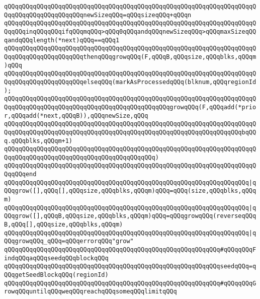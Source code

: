 \verb|qQQqqQQqqQQqqQQqqQQqqQQqqQQqqQQqqQQqqQQqqQQqqQQqqQQqqQQqqQQqqQQqqQQqqQQqqQQqqQQqqQQqqQQqqQQqnewSizeqQQq=qQQqsizeqQQq+qQQqn|\newline
\verb|qQQqqQQqqQQqqQQqqQQqqQQqqQQqqQQqqQQqqQQqqQQqqQQqqQQqqQQqqQQqqQQqqQQqqQQqqQQqinqQQqqQQqifqQQqmqQQq>qQQq0qQQqandqQQqnewSizeqQQq>qQQqmaxSizeqQQqandqQQqlength(*next)qQQq==qQQq1|\newline
\verb|qQQqqQQqqQQqqQQqqQQqqQQqqQQqqQQqqQQqqQQqqQQqqQQqqQQqqQQqqQQqqQQqqQQqqQQqqQQqqQQqqQQqqQQqqQQqthenqQQqgrowqQQq(F,qQQqB,qQQqsize,qQQqblks,qQQqm)qQQq|\newline
\verb|qQQqqQQqqQQqqQQqqQQqqQQqqQQqqQQqqQQqqQQqqQQqqQQqqQQqqQQqqQQqqQQqqQQqqQQqqQQqqQQqqQQqqQQqqQQqelseqQQq(markAsProcessedqQQq(blknum,qQQqregionId);|\newline
\verb|qQQqqQQqqQQqqQQqqQQqqQQqqQQqqQQqqQQqqQQqqQQqqQQqqQQqqQQqqQQqqQQqqQQqqQQqqQQqqQQqqQQqqQQqqQQqqQQqqQQqqQQqqQQqqQQqqQQqgrowqQQq(F,qQQqadd(*prior,qQQqadd(*next,qQQqB)),qQQqnewSize,qQQq|\newline
\verb|qQQqqQQqqQQqqQQqqQQqqQQqqQQqqQQqqQQqqQQqqQQqqQQqqQQqqQQqqQQqqQQqqQQqqQQqqQQqqQQqqQQqqQQqqQQqqQQqqQQqqQQqqQQqqQQqqQQqqQQqqQQqqQQqqQQqqQQqbqQQq.qQQqblks,qQQqm+1)|\newline
\verb|qQQqqQQqqQQqqQQqqQQqqQQqqQQqqQQqqQQqqQQqqQQqqQQqqQQqqQQqqQQqqQQqqQQqqQQqqQQqqQQqqQQqqQQqqQQqqQQqqQQqqQQqqQQqqQQq)|\newline
\verb|qQQqqQQqqQQqqQQqqQQqqQQqqQQqqQQqqQQqqQQqqQQqqQQqqQQqqQQqqQQqqQQqqQQqqQQqqQQqend|\newline
\verb|qQQqqQQqqQQqqQQqqQQqqQQqqQQqqQQqqQQqqQQqqQQqqQQqqQQqqQQqqQQqqQQqqQQq|\verb#|qQQqgrow([],qQQq[],qQQqsize,qQQqblks,qQQqm)qQQq=qQQq(size,qQQqblks,qQQqm)#\newline
\verb|qQQqqQQqqQQqqQQqqQQqqQQqqQQqqQQqqQQqqQQqqQQqqQQqqQQqqQQqqQQqqQQqqQQq|\verb#|qQQqgrow([],qQQqB,qQQqsize,qQQqblks,qQQqm)qQQq=qQQqgrowqQQq(reverseqQQqB,qQQq[],qQQqsize,qQQqblks,qQQqm)#\newline
\verb|qQQqqQQqqQQqqQQqqQQqqQQqqQQqqQQqqQQqqQQqqQQqqQQqqQQqqQQqqQQqqQQqqQQq|\verb#|qQQqgrowqQQq_qQQq=qQQqerrorqQQq"grow"#\newline
\newline
\verb|qQQqqQQqqQQqqQQqqQQqqQQqqQQqqQQqqQQqqQQqqQQqqQQqqQQqqQQqqQQq#qQQqqQQqFindqQQqaqQQqseedqQQqblockqQQq|\newline
\verb|qQQqqQQqqQQqqQQqqQQqqQQqqQQqqQQqqQQqqQQqqQQqqQQqqQQqqQQqqQQqseedqQQq=qQQqgetSeedBlockqQQq(regionId)|\newline
\newline
\verb|qQQqqQQqqQQqqQQqqQQqqQQqqQQqqQQqqQQqqQQqqQQqqQQqqQQqqQQqqQQq#qQQqqQQqGrowqQQquntilqQQqweqQQqreachqQQqsomeqQQqlimitqQQq|\newline
